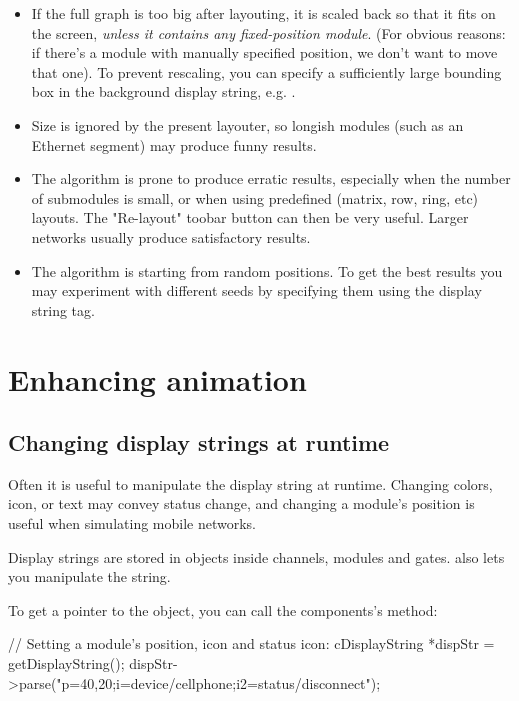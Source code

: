 \begin{itemize}
  \item If the full graph is too big after layouting, it is scaled
    back so that it fits on the screen, \textit{unless it contains
    any fixed-position module}. (For obvious reasons: if there's a module
    with manually specified position, we don't want to move that one).
    To prevent rescaling, you can specify a sufficiently large bounding
    box in the background display string, e.g. .
  \item Size is ignored by the present layouter, so longish modules
    (such as an Ethernet segment) may produce funny results.
  \item The algorithm is prone to produce erratic results, especially
    when the number of submodules is small, or when using predefined
    (matrix, row, ring, etc) layouts. The "Re-layout" toobar button
    can then be very useful. Larger networks usually produce
    satisfactory results.
  \item The algorithm is starting from random positions.
     To get the best results you may experiment with
    different seeds by specifying them using the 
    display string tag.
\end{itemize}

\section{Enhancing animation}

\subsection{Changing display strings at runtime}

Often it is useful to manipulate the display string at runtime.
Changing colors, icon, or text may convey status change, and
changing a module's position is useful when simulating mobile
networks.

Display strings are stored in  objects inside
channels, modules and gates.  also lets you
manipulate the string.

To get a pointer to the  object, you can call
the components's  method:

\begin{cpp}
// Setting a module's position, icon and status icon:
cDisplayString *dispStr = getDisplayString();
dispStr->parse("p=40,20;i=device/cellphone;i2=status/disconnect");
\end{cpp}

